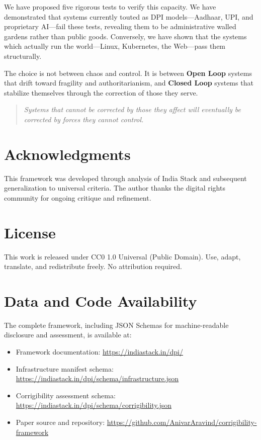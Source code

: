 \documentclass{article}
\begin{document}
We have proposed five rigorous tests to verify this capacity. We have demonstrated that systems currently touted as DPI models---Aadhaar, UPI, and proprietary AI---fail these tests, revealing them to be administrative walled gardens rather than public goods. Conversely, we have shown that the systems which actually run the world---Linux, Kubernetes, the Web---pass them structurally.

The choice is not between chaos and control. It is between \textbf{Open Loop} systems that drift toward fragility and authoritarianism, and \textbf{Closed Loop} systems that stabilize themselves through the correction of those they serve.

\begin{quote}
\textit{Systems that cannot be corrected by those they affect will eventually be corrected by forces they cannot control.}
\end{quote}

\section*{Acknowledgments}

This framework was developed through analysis of India Stack and subsequent generalization to universal criteria. The author thanks the digital rights community for ongoing critique and refinement.

\section*{License}

This work is released under CC0 1.0 Universal (Public Domain). Use, adapt, translate, and redistribute freely. No attribution required.

\section*{Data and Code Availability}

The complete framework, including JSON Schemas for machine-readable disclosure and assessment, is available at:

\begin{itemize}
    \item Framework documentation: \url{https://indiastack.in/dpi/}
    \item Infrastructure manifest schema: \url{https://indiastack.in/dpi/schema/infrastructure.json}
    \item Corrigibility assessment schema: \url{https://indiastack.in/dpi/schema/corrigibility.json}
    \item Paper source and repository: \url{https://github.com/AnivarAravind/corrigibility-framework}
\end{itemize}
\end{document}
